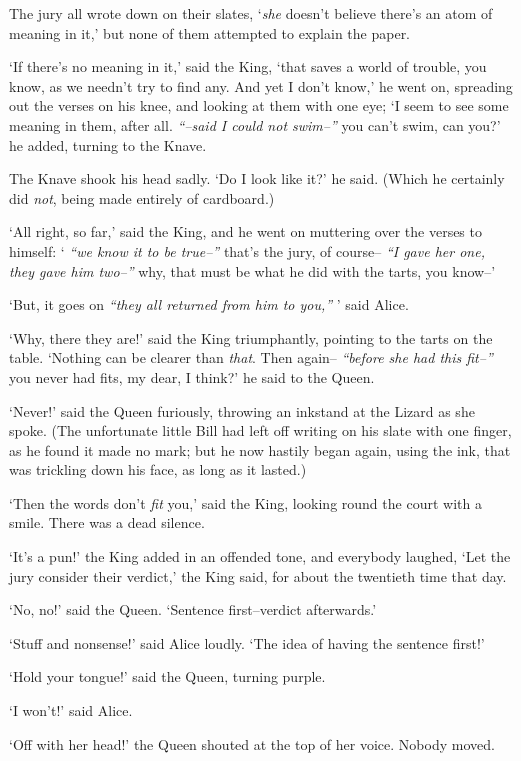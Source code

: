   The jury all wrote down on their slates, `{\it she} doesn't believe
there's an atom of meaning in it,' but none of them attempted to
explain the paper.

  `If there's no meaning in it,' said the King, `that saves a
world of trouble, you know, as we needn't try to find any.  And
yet I don't know,' he went on, spreading out the verses on his
knee, and looking at them with one eye; `I seem to see some
meaning in them, after all.  {\it ``--said I could not swim--''} you
can't swim, can you?' he added, turning to the Knave.

  The Knave shook his head sadly.  `Do I look like it?' he said.
(Which he certainly did {\it not}, being made entirely of cardboard.)

  `All right, so far,' said the King, and he went on muttering
over the verses to himself:  ` {\it ``we know it to be true--''} that's
the jury, of course-- {\it ``I gave her one, they gave him two--''} why,
that must be what he did with the tarts, you know--'

  `But, it goes on {\it ``they all returned from him to you,''} ' said
Alice.

  `Why, there they are!' said the King triumphantly, pointing to
the tarts on the table.  `Nothing can be clearer than {\it that}.
Then again-- {\it ``before she had this fit--''}  you never had fits, my
dear, I think?' he said to the Queen.

  `Never!' said the Queen furiously, throwing an inkstand at the
Lizard as she spoke.  (The unfortunate little Bill had left off
writing on his slate with one finger, as he found it made no
mark; but he now hastily began again, using the ink, that was
trickling down his face, as long as it lasted.)

  `Then the words don't {\it fit} you,' said the King, looking round
the court with a smile.  There was a dead silence.

  `It's a pun!' the King added in an offended tone, and
everybody laughed, `Let the jury consider their verdict,' the
King said, for about the twentieth time that day.

  `No, no!' said the Queen.  `Sentence first--verdict afterwards.'

  `Stuff and nonsense!' said Alice loudly.  `The idea of having
the sentence first!'

  `Hold your tongue!' said the Queen, turning purple.

  `I won't!' said Alice.

  `Off with her head!' the Queen shouted at the top of her voice.
Nobody moved.

